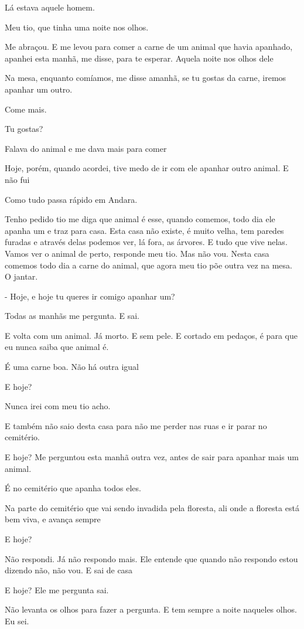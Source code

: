 Lá estava aquele homem.

Meu tio, que tinha uma noite nos olhos.

Me abraçou. E me levou para comer a carne de um animal que havia
apanhado, apanhei esta manhã, me disse, para te esperar. Aquela noite
nos olhos dele

Na mesa, enquanto comíamos, me disse amanhã, se tu gostas da carne,
iremos apanhar um outro.

Come mais.

Tu gostas?

Falava do animal e me dava mais para comer

Hoje, porém, quando acordei, tive medo de ir com ele apanhar outro
animal. E não fui

Como tudo passa rápido em Andara.

Tenho pedido tio me diga que animal é esse, quando comemos, todo dia ele
apanha um e traz para casa. Esta casa não existe, é muito velha, tem
paredes furadas e através delas podemos ver, lá fora, as árvores. E tudo
que vive nelas. Vamos ver o animal de perto, responde meu tio. Mas não
vou. Nesta casa comemos todo dia a carne do animal, que agora meu tio
põe outra vez na mesa. O jantar.

- Hoje, e hoje tu queres ir comigo apanhar um?

Todas as manhãs me pergunta. E sai.

E volta com um animal. Já morto. E sem pele. E cortado em pedaços, é
para que eu nunca saiba que animal é.

É uma carne boa. Não há outra igual

E hoje?

Nunca irei com meu tio acho.

E também não saio desta casa para não me perder nas ruas e ir parar no
cemitério.

E hoje? Me perguntou esta manhã outra vez, antes de sair para apanhar
mais um animal.

É no cemitério que apanha todos eles.

Na parte do cemitério que vai sendo invadida pela floresta, ali onde a
floresta está bem viva, e avança sempre

E hoje?

Não respondi. Já não respondo mais. Ele entende que quando não respondo
estou dizendo não, não vou. E sai de casa

E hoje? Ele me pergunta sai.

Não levanta os olhos para fazer a pergunta. E tem sempre a noite
naqueles olhos. Eu sei.

